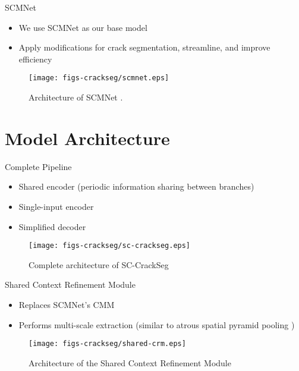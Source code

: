 \documentclass{libs/curtin_format}
\begin{document}
\begin{frame}{SCMNet}
\vspace{0.1cm}
    \begin{itemize}
        \item We use SCMNet \cite{singha2021scmnet} as our base model
        \item Apply modifications for crack segmentation, streamline, and improve efficiency
    \end{itemize}
    \begin{figure}
        \centering
        \texttt{[image: figs-crackseg/scmnet.eps]}
        \caption{Architecture of SCMNet \cite{singha2021scmnet}.}
        \label{fig:farme2}
    \end{figure}
\end{frame}
\section{Model Architecture}

\begin{frame}{Complete Pipeline}
\begin{itemize}
        \item Shared encoder (periodic information sharing between branches)
        \item Single-input encoder
        \item Simplified decoder
    \end{itemize}
   \begin{figure}
        \centering        
        \texttt{[image: figs-crackseg/sc-crackseg.eps]}
        \caption{Complete architecture of SC-CrackSeg}        
        \label{fig:pipeline}
    \end{figure}
\end{frame}

\begin{frame}{Shared Context Refinement Module}
\begin{itemize}
        \item Replaces SCMNet's CMM
        \item Performs multi-scale extraction (similar to atrous spatial pyramid pooling \cite{chen2017deeplab})
    \end{itemize}
   \begin{figure}
        \centering        
        \texttt{[image: figs-crackseg/shared-crm.eps]}
        \caption{Architecture of the Shared Context Refinement Module}        
        \label{fig:pipeline}
    \end{figure}
\end{frame}
\end{document}
